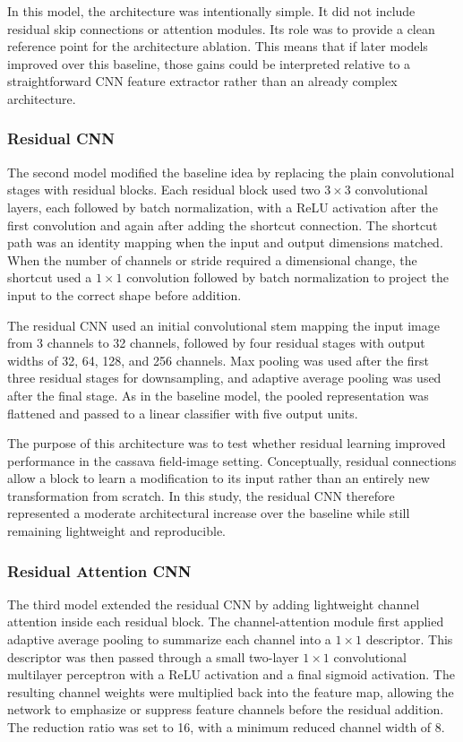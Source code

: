 \documentclass[11pt]{article}
\begin{document}
In this model, the architecture was intentionally simple. It did not include residual skip connections or attention modules. Its role was to provide a clean reference point for the architecture ablation. This means that if later models improved over this baseline, those gains could be interpreted relative to a straightforward CNN feature extractor rather than an already complex architecture.

\subsubsection{Residual CNN}

The second model modified the baseline idea by replacing the plain convolutional stages with residual blocks. Each residual block used two \(3 \times 3\) convolutional layers, each followed by batch normalization, with a ReLU activation after the first convolution and again after adding the shortcut connection. The shortcut path was an identity mapping when the input and output dimensions matched. When the number of channels or stride required a dimensional change, the shortcut used a \(1 \times 1\) convolution followed by batch normalization to project the input to the correct shape before addition.

The residual CNN used an initial convolutional stem mapping the input image from 3 channels to 32 channels, followed by four residual stages with output widths of 32, 64, 128, and 256 channels. Max pooling was used after the first three residual stages for downsampling, and adaptive average pooling was used after the final stage. As in the baseline model, the pooled representation was flattened and passed to a linear classifier with five output units.

The purpose of this architecture was to test whether residual learning improved performance in the cassava field-image setting. Conceptually, residual connections allow a block to learn a modification to its input rather than an entirely new transformation from scratch. In this study, the residual CNN therefore represented a moderate architectural increase over the baseline while still remaining lightweight and reproducible.

\subsubsection{Residual Attention CNN}

The third model extended the residual CNN by adding lightweight channel attention inside each residual block. The channel-attention module first applied adaptive average pooling to summarize each channel into a \(1 \times 1\) descriptor. This descriptor was then passed through a small two-layer \(1 \times 1\) convolutional multilayer perceptron with a ReLU activation and a final sigmoid activation. The resulting channel weights were multiplied back into the feature map, allowing the network to emphasize or suppress feature channels before the residual addition. The reduction ratio was set to 16, with a minimum reduced channel width of 8.
\end{document}
